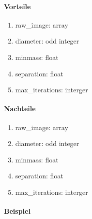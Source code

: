 	\paragraph{Vorteile}
		\begin{enumerate}
    			\item raw\_image: array \\

    			\item diameter: odd integer \\

    			\item minmass: float \\
    			
    			\item separation: float\\
 			
    			\item max\_iterations: interger\\
    			
		\end{enumerate}
		
	\paragraph{Nachteile}
		\begin{enumerate}
    			\item raw\_image: array \\

    			\item diameter: odd integer \\

    			\item minmass: float \\
    			
    			\item separation: float\\
 			
    			\item max\_iterations: interger\\
    			
		\end{enumerate}
		
	\paragraph{Beispiel}


